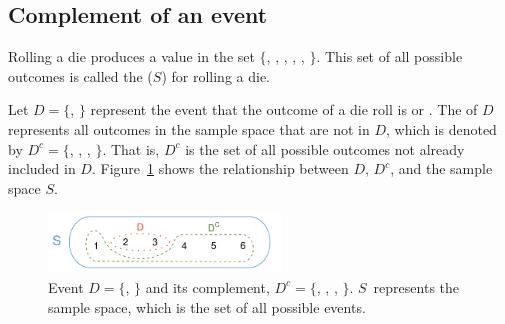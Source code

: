 
\subsection{Complement of an event}

Rolling a die produces a value in the set $\{$, , , , , $\}$. This set of all possible outcomes is called the  ($S$) for rolling a die. 

Let $D=\{$, $\}$ represent the event that the outcome of a die roll is  or . The  of $D$ represents all outcomes in the sample space that are not in $D$, which is denoted by $D^c = \{$, , , $\}$. That is, $D^c$ is the set of all possible outcomes not already included in $D$. Figure~\ref{fig:complementOfD} shows the relationship between $D$, $D^c$, and the sample space $S$. 

\begin{figure}[hht]
\centering
\includegraphics[width=0.55\textwidth]{ch_probability_oi_biostat/figures/complementOfD/complementOfD}
\caption{Event $D=\{$, $\}$ and its complement, $D^c = \{$, , , $\}$. $S$~represents the sample space, which is the set of all possible events.}
\label{fig:complementOfD}
\end{figure}


